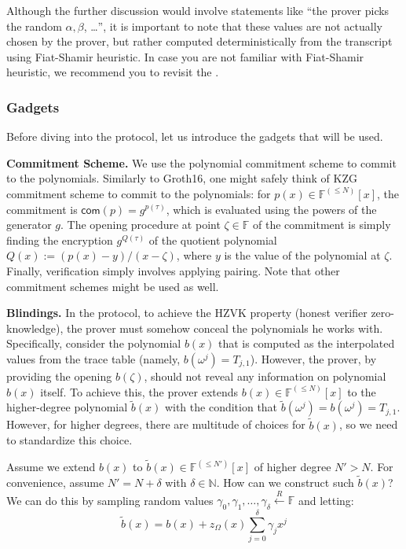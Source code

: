 \documentclass[../lecture-notes.tex]{subfiles}
\begin{document}
\begin{remark}
    Although the further discussion would involve statements like ``the prover
    picks the random $\alpha,\beta$, \ldots'', it is important to note that
    these values are not actually chosen by the prover, but rather computed
    deterministically from the transcript using Fiat-Shamir heuristic. In case 
    you are not familiar with Fiat-Shamir heuristic, we recommend you to revisit
    the .
\end{remark}

\subsubsection{Gadgets}

Before diving into the protocol, let us introduce the gadgets that will be used.

\textcolor{blue!60!black}{\textbf{Commitment Scheme.}} We use the polynomial
commitment scheme to commit to the polynomials. Similarly to Groth16, one might
safely think of KZG commitment scheme to commit to the polynomials: for $p(x)
\in \mathbb{F}^{(\leq N)}[x]$, the commitment is $\mathsf{com}(p) =
g^{p(\tau)}$, which is evaluated using the powers of the generator $g$. The
opening procedure at point $\zeta \in \mathbb{F}$ of the commitment is simply
finding the encryption $g^{Q(\tau)}$ of the quotient polynomial $Q(x) :=
(p(x)-y)/(x-\zeta)$, where $y$ is the value of the polynomial at $\zeta$.
Finally, verification simply involves applying pairing. Note that other
commitment schemes might be used as well.

\textcolor{blue!60!black}{\textbf{Blindings.}} In the protocol, to achieve 
the HZVK property (honest verifier zero-knowledge), the prover must somehow 
conceal the polynomials he works with. Specifically, consider the polynomial 
$b(x)$ that is computed as the interpolated values from the trace table (namely, 
$b(\omega^j) = T_{j,1}$). However, the prover, by providing the opening $b(\zeta)$,
should not reveal any information on polynomial $b(x)$ itself. To achieve this, the prover
extends $b(x) \in \mathbb{F}^{(\leq N)}[x]$ to the higher-degree polynomial $\widetilde{b}(x)$
with the condition that $\widetilde{b}(\omega^j) = b(\omega^j) = T_{j,1}$. However, for higher 
degrees, there are multitude of choices for $\widetilde{b}(x)$, so we need to standardize 
this choice. 

Assume we extend $b(x)$ to $\widetilde{b}(x) \in \mathbb{F}^{(\leq N')}[x]$ of
higher degree $N'>N$. For convenience, assume $N' = N + \delta$ with $\delta \in
\mathbb{N}$. How can we construct such $\widetilde{b}(x)$? We can do this by
sampling random values $\gamma_0,\gamma_1,\dots,\gamma_{\delta} \xleftarrow{R} \mathbb{F}$ and 
letting:
\begin{equation*}
    \widetilde{b}(x) = b(x) + z_{\Omega}(x)\sum_{j=0}^{\delta}\gamma_jx^j
\end{equation*}
\end{document}
